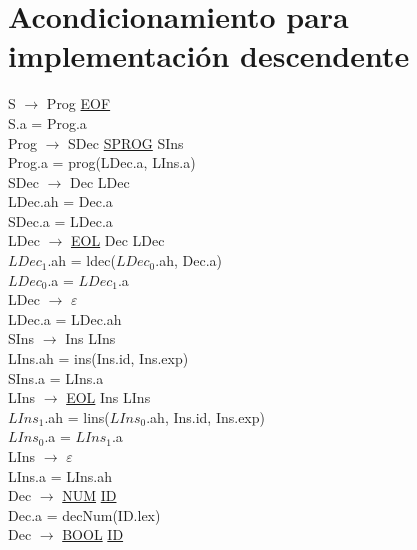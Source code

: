 \documentclass[\main/MemoriaPL.tex]{subfiles}
\begin{document}
  \section{Acondicionamiento para implementación descendente}
    S $\rightarrow$ Prog \underline{EOF}\\
    \hspace{5mm}S.a = Prog.a\\
    Prog $\rightarrow$ SDec \underline{SPROG} SIns\\
    \hspace{5mm}Prog.a = prog(LDec.a, LIns.a)\\
    SDec $\rightarrow$ Dec LDec\\
    \hspace{5mm}LDec.ah = Dec.a\\
    \hspace{5mm}SDec.a = LDec.a\\
    LDec $\rightarrow$ \underline{EOL} Dec LDec\\
    \hspace{5mm}$LDec_1$.ah = ldec($LDec_0$.ah, Dec.a)\\
    \hspace{5mm}$LDec_0$.a = $LDec_1$.a\\
    LDec $\rightarrow$ $\varepsilon$\\
    \hspace{5mm}LDec.a = LDec.ah\\
    SIns $\rightarrow$ Ins LIns\\
    \hspace{5mm}LIns.ah = ins(Ins.id, Ins.exp)\\
    \hspace{5mm}SIns.a = LIns.a\\
    LIns $\rightarrow$ \underline{EOL} Ins LIns\\
    \hspace{5mm}$LIns_1$.ah = lins($LIns_0$.ah, Ins.id, Ins.exp)\\
    \hspace{5mm}$LIns_0$.a = $LIns_1$.a\\
    LIns $\rightarrow$ $\varepsilon$\\
    \hspace{5mm}LIns.a = LIns.ah\\
    Dec $\rightarrow$ \underline{NUM} \underline{ID}\\
    \hspace{5mm}Dec.a = decNum(ID.lex)\\
    Dec $\rightarrow$ \underline{BOOL} \underline{ID}\\
\end{document}
